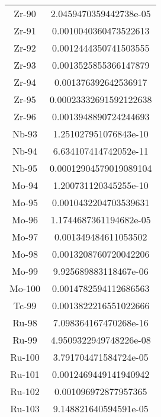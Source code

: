 \begin{table}[h!]
\begin{tabular}{|| c || c |}
Zr-90 & 2.0459470359442738e-05 \\
Zr-91 & 0.0010040360473522613 \\
Zr-92 & 0.0012444350741503555 \\
Zr-93 & 0.0013525855366147879 \\
Zr-94 & 0.001376392642536917 \\
Zr-95 & 0.00023332691592122638 \\
Zr-96 & 0.0013948890724244693 \\
Nb-93 & 1.251027951076843e-10 \\
Nb-94 & 6.634107414742052e-11 \\
Nb-95 & 0.00012904579019089104 \\
Mo-94 & 1.200731120345255e-10 \\
Mo-95 & 0.0010432204703539631 \\
Mo-96 & 1.1744687361194682e-05 \\
Mo-97 & 0.001349484611053502 \\
Mo-98 & 0.0013208760720042206 \\
Mo-99 & 9.925689883118467e-06 \\
Mo-100 & 0.0014782594112686563 \\
Tc-99 & 0.0013822216551022666 \\
Ru-98 & 7.098364167470268e-16 \\
Ru-99 & 4.9509322949748226e-08 \\
Ru-100 & 3.791704471584724e-05 \\
Ru-101 & 0.0012469449141940942 \\
Ru-102 & 0.001096972877957365 \\
Ru-103 & 9.148821640594591e-05 \\
Ru-104 & 0.0005769558455907567 \\
Ru-105 & 2.020321205352769e-07 \\
Ru-106 & 0.00013464382472322978 \\
Rh-103 & 0.0006573771223835509 \\
Rh-105 & 1.535340085017016e-06 \\
Pd-104 & 9.54748608812177e-05 \\
Pd-105 & 0.0003278314871913321 \\
Pd-106 & 8.530355223150002e-05 \\
Pd-107 & 0.00010815319055143645 \\
Pd-108 & 6.464665930919654e-05 \\
Pd-110 & 2.31011679417111e-05 \\
Ag-107 & 6.9324237286364174e-12 \\

\end{tabular}
\end{table}
